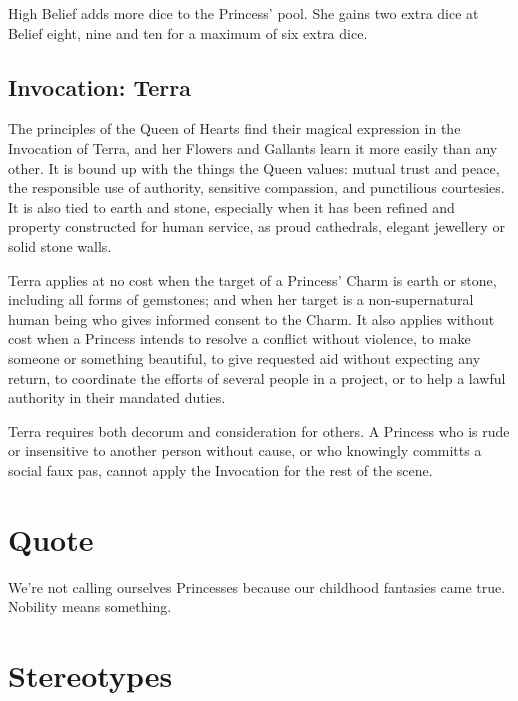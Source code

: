 High Belief adds more dice to the Princess' pool. She gains two extra dice at Belief eight, nine and ten for a maximum of six extra dice. 
\subsection*{Invocation: Terra}
The principles of the Queen of Hearts find their magical expression in the Invocation of Terra, and her Flowers and Gallants learn it more easily than any other. It is bound up with the things the Queen values: mutual trust and peace, the responsible use of authority, sensitive compassion, and punctilious courtesies. It is also tied to earth and stone, especially when it has been refined and property constructed for human service, as proud cathedrals, elegant jewellery or solid stone walls.

Terra applies at no cost when the target of a Princess' Charm is earth or stone, including all forms of gemstones; and when her target is a non-supernatural human being who gives informed consent to the Charm. It also applies without cost when a Princess intends to resolve a conflict without violence, to make someone or something beautiful, to give requested aid without expecting any return, to coordinate the efforts of several people in a project, or to help a lawful authority in their mandated duties.

Terra requires both decorum and consideration for others. A Princess who is rude or insensitive to another person without cause, or who knowingly committs a social faux pas, cannot apply the Invocation for the rest of the scene.

\section*{Quote}

We're not calling ourselves Princesses because our childhood fantasies came true. Nobility means something. 

\section*{Stereotypes}

